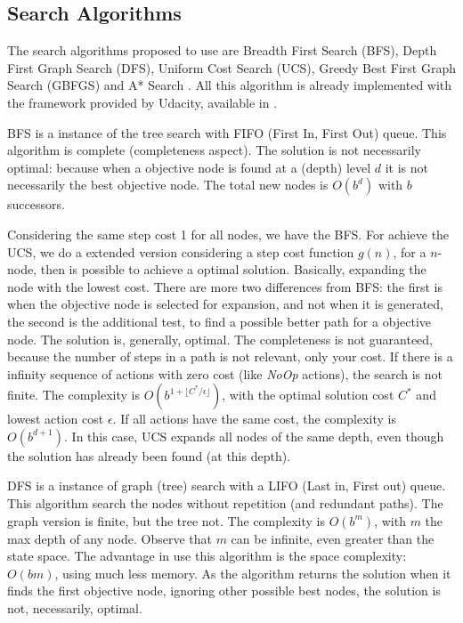 \documentclass[a4paper]{article}
\begin{document}
\subsection{Search Algorithms}

The search algorithms proposed to use are Breadth First Search (BFS), Depth First Graph Search (DFS), Uniform Cost Search (UCS), Greedy Best First Graph Search (GBFGS) and A* Search \cite{githubUdacityAINDProj2}. All this algorithm is already implemented with the framework provided by Udacity, available in \cite{githubUdacityAINDProj2}.

BFS is a instance of the tree search with FIFO (First In, First Out) queue. This algorithm is complete (completeness aspect). The solution is not necessarily optimal: because when a objective node is found at a (depth) level $d$ it is not necessarily the best objective node. The total new nodes is $O(b^d)$ with $b$ successors. 

Considering the same step cost 1 for all nodes, we have the BFS. For achieve the UCS, we do a extended version considering a step cost function $g(n)$, for a $n$-node, then is possible to achieve a optimal solution. Basically, expanding the node with the lowest cost. There are more two differences from BFS: the first is when the objective node is selected for expansion, and not when it is generated, the second is the additional test, to find a possible better path for a objective node. The solution is, generally, optimal. The completeness is not guaranteed, because the number of steps in a path is not relevant, only your cost. If there is a infinity sequence of actions with zero cost (like \emph{NoOp} actions), the search is not finite. The complexity is $O(b^{1+ \lfloor C^*/\epsilon \rfloor})$, with the optimal solution cost $C^*$ and lowest action cost $\epsilon$. If all actions have the same cost, the complexity is $O(b^{d+1})$. In this case, UCS expands all nodes of the same depth, even though the solution has already been found (at this depth).

DFS is a instance of graph (tree) search with a LIFO (Last in, First out) queue. This algorithm search the nodes without repetition (and redundant paths). The graph version is finite, but the tree not. The complexity is $O(b^m)$, with $m$ the max depth of any node. Observe that $m$ can be infinite, even greater than the state space. The advantage in use this algorithm is the space complexity: $O(bm)$, using much less memory. As the algorithm returns the solution when it finds the first objective node, ignoring other possible best nodes, the solution is not, necessarily, optimal.
\end{document}
